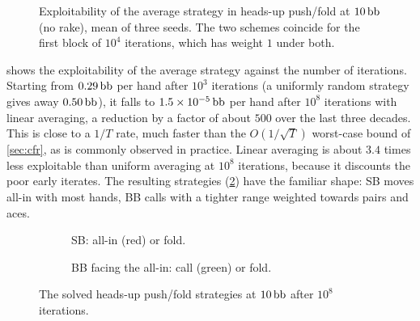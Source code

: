 \begin{figure}[ht]
\centering
{}
\caption{Exploitability of the average strategy in heads-up push/fold at $10\,\mathrm{bb}$ (no rake), mean of three seeds. The two schemes coincide for the first block of $10^4$ iterations, which has weight $1$ under both.}
\label{fig:pushfold-expl}
\end{figure}

 shows the exploitability of the average strategy against the number of iterations. Starting from $0.29\,\mathrm{bb}$ per hand after $10^3$ iterations (a uniformly random strategy gives away $0.50\,\mathrm{bb}$), it falls to $1.5\times 10^{-5}\,\mathrm{bb}$ per hand after $10^8$ iterations with linear averaging, a reduction by a factor of about $500$ over the last three decades. This is close to a $1/T$ rate, much faster than the $O(1/\sqrt{T})$ worst-case bound of \cref{sec:cfr}, as is commonly observed in practice. Linear averaging is about $3.4$ times less exploitable than uniform averaging at $10^8$ iterations, because it discounts the poor early iterates. The resulting strategies (\cref{fig:pushfold-grids}) have the familiar shape: SB moves all-in with most hands, BB calls with a tighter range weighted towards pairs and aces.

\begin{figure}[ht]
\centering
\begin{subfigure}[t]{0.48\linewidth}\centering
  
  \caption{SB: all-in (red) or fold.}
\end{subfigure}\hfill
\begin{subfigure}[t]{0.48\linewidth}\centering
  
  \caption{BB facing the all-in: call (green) or fold.}
\end{subfigure}
\caption{The solved heads-up push/fold strategies at $10\,\mathrm{bb}$ after $10^8$ iterations.}
\label{fig:pushfold-grids}
\end{figure}

